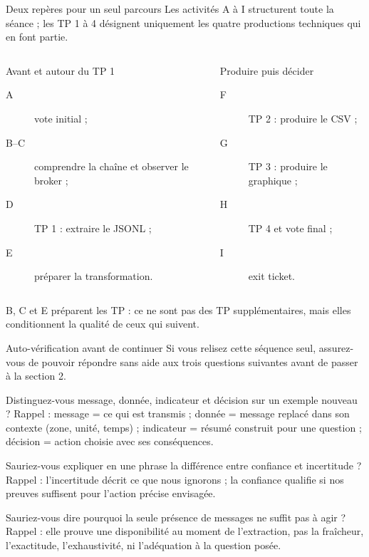 \documentclass[aspectratio=169]{beamer}
\begin{document}
\begin{frame}{Deux repères pour un seul parcours}
  \small
  Les activités A à I structurent toute la séance ; les TP 1 à 4 désignent uniquement les quatre productions techniques qui en font partie.
  \begin{columns}[T]
    \begin{block}{Avant et autour du TP 1}
      \begin{description}
        \item[A] vote initial ;
        \item[B--C] comprendre la chaîne et observer le broker ;
        \item[D] TP 1 : extraire le JSONL ;
        \item[E] préparer la transformation.
      \end{description}
    \end{block}
    \begin{block}{Produire puis décider}
      \begin{description}
        \item[F] TP 2 : produire le CSV ;
        \item[G] TP 3 : produire le graphique ;
        \item[H] TP 4 et vote final ;
        \item[I] exit ticket.
      \end{description}
    \end{block}
  \end{columns}
  \alert{B, C et E préparent les TP : ce ne sont pas des TP supplémentaires, mais elles conditionnent la qualité de ceux qui suivent.}
\end{frame}

\begin{frame}{Auto-vérification avant de continuer}
  \small
  Si vous relisez cette séquence seul, assurez-vous de pouvoir répondre sans aide aux trois questions suivantes avant de passer à la section 2.
  \begin{block}{Distinguez-vous message, donnée, indicateur et décision sur un exemple nouveau ?}
    Rappel : message = ce qui est transmis ; donnée = message replacé dans son contexte (zone, unité, temps) ; indicateur = résumé construit pour une question ; décision = action choisie avec ses conséquences.
  \end{block}
  \begin{block}{Sauriez-vous expliquer en une phrase la différence entre confiance et incertitude ?}
    Rappel : l'incertitude décrit ce que nous ignorons ; la confiance qualifie si nos preuves suffisent pour l'action précise envisagée.
  \end{block}
  \begin{block}{Sauriez-vous dire pourquoi la seule présence de messages ne suffit pas à agir ?}
    Rappel : elle prouve une disponibilité au moment de l'extraction, pas la fraîcheur, l'exactitude, l'exhaustivité, ni l'adéquation à la question posée.
  \end{block}
\end{frame}
\end{document}
